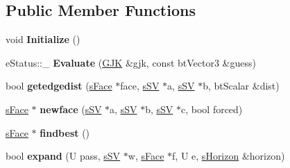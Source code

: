\subsection*{Public Member Functions}
\begin{DoxyCompactItemize}
\item 
\hypertarget{structgjkepa2__impl_1_1_e_p_a_a5f6c9f49dd9fcd223aba906afa1dad7f}{void {\bfseries Initialize} ()}\label{structgjkepa2__impl_1_1_e_p_a_a5f6c9f49dd9fcd223aba906afa1dad7f}

\item 
\hypertarget{structgjkepa2__impl_1_1_e_p_a_a66edbc762eb8ac621d32f4620a5dfc35}{e\+Status\+::\+\_\+ {\bfseries Evaluate} (\hyperlink{structgjkepa2__impl_1_1_g_j_k}{G\+J\+K} \&gjk, const bt\+Vector3 \&guess)}\label{structgjkepa2__impl_1_1_e_p_a_a66edbc762eb8ac621d32f4620a5dfc35}

\item 
\hypertarget{structgjkepa2__impl_1_1_e_p_a_af1bbe833b095a7ff62fa6ca969f22e16}{bool {\bfseries getedgedist} (\hyperlink{structgjkepa2__impl_1_1_e_p_a_1_1s_face}{s\+Face} $\ast$face, \hyperlink{structgjkepa2__impl_1_1_g_j_k_1_1s_s_v}{s\+S\+V} $\ast$a, \hyperlink{structgjkepa2__impl_1_1_g_j_k_1_1s_s_v}{s\+S\+V} $\ast$b, bt\+Scalar \&dist)}\label{structgjkepa2__impl_1_1_e_p_a_af1bbe833b095a7ff62fa6ca969f22e16}

\item 
\hypertarget{structgjkepa2__impl_1_1_e_p_a_ac01d46e7801045987e4c7b46f6d08e1d}{\hyperlink{structgjkepa2__impl_1_1_e_p_a_1_1s_face}{s\+Face} $\ast$ {\bfseries newface} (\hyperlink{structgjkepa2__impl_1_1_g_j_k_1_1s_s_v}{s\+S\+V} $\ast$a, \hyperlink{structgjkepa2__impl_1_1_g_j_k_1_1s_s_v}{s\+S\+V} $\ast$b, \hyperlink{structgjkepa2__impl_1_1_g_j_k_1_1s_s_v}{s\+S\+V} $\ast$c, bool forced)}\label{structgjkepa2__impl_1_1_e_p_a_ac01d46e7801045987e4c7b46f6d08e1d}

\item 
\hypertarget{structgjkepa2__impl_1_1_e_p_a_a906d2b41e82262cc702fedac99e88906}{\hyperlink{structgjkepa2__impl_1_1_e_p_a_1_1s_face}{s\+Face} $\ast$ {\bfseries findbest} ()}\label{structgjkepa2__impl_1_1_e_p_a_a906d2b41e82262cc702fedac99e88906}

\item 
\hypertarget{structgjkepa2__impl_1_1_e_p_a_a279ea2052f9a7bfc3a1bd5024bb6ad17}{bool {\bfseries expand} (U pass, \hyperlink{structgjkepa2__impl_1_1_g_j_k_1_1s_s_v}{s\+S\+V} $\ast$w, \hyperlink{structgjkepa2__impl_1_1_e_p_a_1_1s_face}{s\+Face} $\ast$f, U e, \hyperlink{structgjkepa2__impl_1_1_e_p_a_1_1s_horizon}{s\+Horizon} \&horizon)}\label{structgjkepa2__impl_1_1_e_p_a_a279ea2052f9a7bfc3a1bd5024bb6ad17}

\end{DoxyCompactItemize}
